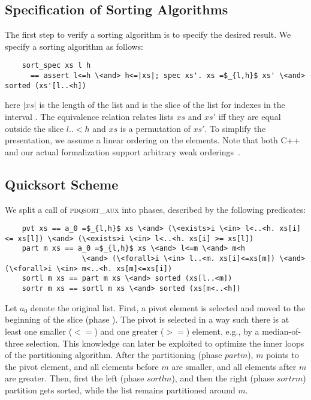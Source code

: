 \documentclass[runningheads]{llncs}
\begin{document}
  \subsection{Specification of Sorting Algorithms}\label{sec:sortspec}
  The first step to verify a sorting algorithm is to specify the desired result.
  We specify a sorting algorithm as follows:
  \begin{lstlisting}
    sort_spec xs l h
      == assert l<=h \<and> h<=|xs|; spec xs'. xs =$_{l,h}$ xs' \<and> sorted (xs'[l..<h])
  \end{lstlisting}
  here \is$|xs|$ is the length of the list  and
   is the slice of the list  for indexes in the interval .
  The equivalence relation  relates lists $xs$ and $xs'$ iff they are equal outside the slice \is$l..<h$
  and $xs$ is a permutation of $xs'$.
  To simplify the presentation, we assume a linear ordering on the elements.
  Note that both C++ and our actual formalization support arbitrary weak orderings~\cite{Josu12}.

  \subsection{Quicksort Scheme}
  We split a call of \textsc{pdqsort\_aux} into phases, described by the following predicates:
  \begin{lstlisting}
    pvt xs == a_0 =$_{l,h}$ xs \<and> (\<exists>i \<in> l<..<h. xs[i] <= xs[l]) \<and> (\<exists>i \<in> l<..<h. xs[i] >= xs[l])
    part m xs == a_0 =$_{l,h}$ xs \<and> l<=m \<and> m<h
                  \<and> (\<forall>i \<in> l..<m. xs[i]<=xs[m]) \<and> (\<forall>i \<in> m<..<h. xs[m]<=xs[i])
    sortl m xs == part m xs \<and> sorted (xs[l..<m])
    sortr m xs == sortl m xs \<and> sorted (xs[m<..<h])
  \end{lstlisting}
  Let \is$a_0$ denote the original list. First, a pivot element is selected and moved to the beginning of the slice (phase ).
  The pivot is selected in a way such there is at least one smaller (\is$<=$) and one greater (\is$>=$) element, e.g., by a median-of-three selection.
  This knowledge can later be exploited to optimize the inner loops of the partitioning algorithm.
  After the partitioning (phase \is$part m$), $m$ points to the pivot element, and all elements before $m$ are smaller, and all elements after $m$ are greater.
  Then, first the left (phase \is$sortl m$), and then the right (phase \is$sortr m$) partition gets sorted, while the list remains partitioned around $m$.
\end{document}
